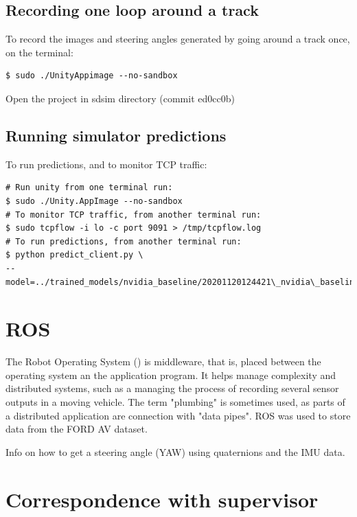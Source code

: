 \subsection{Recording one loop around a track}

To record the images and steering angles generated by going around a track once, on the terminal:
\begin{verbatim}
$ sudo ./UnityAppimage --no-sandbox
\end{verbatim}
Open the project in sdsim directory (commit ed0cc0b)

\subsection{Running simulator predictions}
\label{running-simulator-predictions}

To run predictions, and to monitor TCP traffic:
\begin{verbatim}
# Run unity from one terminal run:
$ sudo ./Unity.AppImage --no-sandbox
# To monitor TCP traffic, from another terminal run:
$ sudo tcpflow -i lo -c port 9091 > /tmp/tcpflow.log
# To run predictions, from another terminal run:
$ python predict_client.py \
--model=../trained_models/nvidia_baseline/20201120124421\_nvidia\_baseline.h5
\end{verbatim}

\section{ROS}
The Robot Operating System (\cite{quigley2009ros}) is middleware, that is, placed between the operating system an the application program. It helps manage complexity and distributed systems, such as a managing the process of recording several sensor outputs in a moving vehicle. The term "plumbing" is sometimes used, as parts of a distributed application are connection with "data pipes".  
ROS was used to store data from the FORD AV dataset.

Info on how to get a steering angle (YAW) using quaternions and the IMU data.

\section{Correspondence with supervisor}
\label{corr_with_super}
